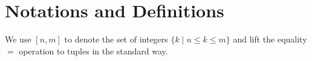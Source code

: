 \documentclass{llncs}
\newcommand{\Var}{\mathtt{Var}}
\newcommand{\Exp}{\mathtt{Exp}}
\newcommand{\Cmd}{\mathtt{Cmd}}
\newcommand{\Grd}{\mathtt{Grd}}
\newcommand{\Prg}{\mathtt{Prg}}
\newcommand{\cur}{cur()}
\newcommand{\ite}[3]{
	 \ifmmode
	 \mathbf{if}\ #1 \ \mathbf{then}\ #2\  \mathbf{else}\ #3
	 \else
	 \textbf{if}\ #1 \ \textbf{then}\ #2\  \textbf{else}\ #3
	 \fi}
\newcommand{\rloop}{
	\ifmmode
	\mathbf{Loop}
	\else
	\textbf{Loop}
	\fi}
\newcommand{\Z}{\mathbb{Z}}
\begin{document}
\section{Notations and Definitions} \label{section:integer-reducers}

We use $[n,m]$ to denote the set of integers $\{k\mid n \leq k\leq m\}$ and lift
the equality $=$ operation to tuples in the standard way.

\end{document}
